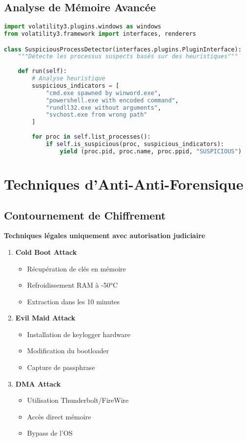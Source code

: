 \subsection{Analyse de Mémoire Avancée}
\begin{lstlisting}[language=Python, caption=Volatility 3 Plugin Custom]
import volatility3.plugins.windows as windows
from volatility3.framework import interfaces, renderers

class SuspiciousProcessDetector(interfaces.plugins.PluginInterface):
    """Détecte les processus suspects basés sur des heuristiques"""
    
    def run(self):
        # Analyse heuristique
        suspicious_indicators = [
            "cmd.exe spawned by winword.exe",
            "powershell.exe with encoded command",
            "rundll32.exe without arguments",
            "svchost.exe from wrong path"
        ]
        
        for proc in self.list_processes():
            if self.is_suspicious(proc, suspicious_indicators):
                yield (proc.pid, proc.name, proc.ppid, "SUSPICIOUS")
\end{lstlisting}

\section{Techniques d'Anti-Anti-Forensique}
\subsection{Contournement de Chiffrement}
\textbf{Techniques légales uniquement avec autorisation judiciaire}

\begin{enumerate}
\item \textbf{Cold Boot Attack}
\begin{itemize}
\item Récupération de clés en mémoire
\item Refroidissement RAM à -50°C
\item Extraction dans les 10 minutes
\end{itemize}

\item \textbf{Evil Maid Attack}
\begin{itemize}
\item Installation de keylogger hardware
\item Modification du bootloader
\item Capture de passphrase
\end{itemize}

\item \textbf{DMA Attack}
\begin{itemize}
\item Utilisation Thunderbolt/FireWire
\item Accès direct mémoire
\item Bypass de l'OS
\end{itemize}
\end{enumerate}


